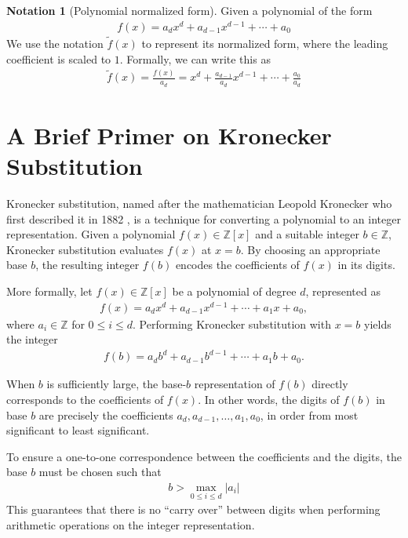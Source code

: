 \documentclass[12pt,reqno]{article}
\theoremstyle{plain}
\theoremstyle{definition}
\newtheorem{notation}{Notation}
\begin{document}
\begin{notation}[Polynomial normalized form]

Given a polynomial of the form
\begin{align*}
f(x) = a_d x^d + a_{d-1} x^{d-1} + \cdots + a_0
\end{align*}
We use the notation $\tilde{f}(x)$ to represent its normalized form, where the leading coefficient is scaled to $1$. Formally, we can write this as
\begin{align*}
    \tilde{f}(x) = \frac{f(x)}{a_d} = x^d + \frac{a_{d-1}}{a_d} x^{d-1} + \cdots + \frac{a_0}{a_d}
\end{align*}
\end{notation}

\section{A Brief Primer on Kronecker Substitution} \label{section:kronecker}
Kronecker substitution, named after the mathematician Leopold Kronecker who first described it in 1882 \cite{kronecker1882}, is a technique for converting a polynomial to an integer representation. Given a polynomial $f(x) \in \mathbb{Z}[x]$ and a suitable integer $b \in \mathbb{Z}$, Kronecker substitution evaluates $f(x)$ at $x = b$. By choosing an appropriate base $b$, the resulting integer $f(b)$ encodes the coefficients of $f(x)$ in its digits.

More formally, let $f(x) \in \mathbb{Z}[x]$ be a polynomial of degree $d$, represented as
\begin{align*}
f(x) = a_d x^d + a_{d-1} x^{d-1} + \cdots + a_1 x + a_0,
\end{align*}
where $a_i \in \mathbb{Z}$ for $0 \leq i \leq d$. Performing Kronecker substitution with $x = b$ yields the integer
\begin{align*}
f(b) = a_d b^d + a_{d-1} b^{d-1} + \cdots + a_1 b + a_0.
\end{align*}

When $b$ is sufficiently large, the base-$b$ representation of $f(b)$ directly corresponds to the coefficients of $f(x)$. In other words, the digits of $f(b)$ in base $b$ are precisely the coefficients $a_d, a_{d-1}, \ldots, a_1, a_0$, in order from most significant to least significant.

To ensure a one-to-one correspondence between the coefficients and the digits, the base $b$ must be chosen such that
\begin{align*}
    b > \max_{0 \leq i \leq d} |a_i|
\end{align*}
This guarantees that there is no ``carry over'' between digits when performing arithmetic operations on the integer representation.
\end{document}
